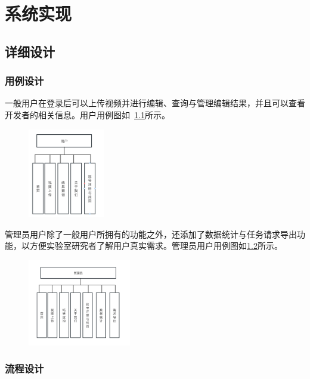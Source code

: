\chapter{系统实现}

\section{详细设计}

\subsection{用例设计}

一般用户在登录后可以上传视频并进行编辑、查询与管理编辑结果，并且可以查看开发者的相关信息。用户用例图如~\ref{fig:user_uml}所示。
\begin{figure}[ht]
    \centering
    \includegraphics[width=0.3\textwidth]{source/img/user_uml.png}
    \label{fig:user_uml}
\end{figure}
管理员用户除了一般用户所拥有的功能之外，还添加了数据统计与任务请求导出功能，以方便实验室研究者了解用户真实需求。管理员用户用例图如\ref{fig:admin_uml}所示。
\begin{figure}[ht]
    \centering
    \includegraphics[width=0.4\textwidth]{source/img/admin_uml.png}
    \label{fig:admin_uml}
\end{figure}

\subsection{流程设计}

